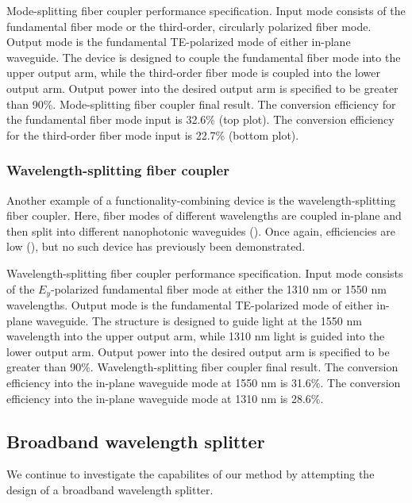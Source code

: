     {Mode-splitting fiber coupler performance specification.
    Input mode consists of the fundamental fiber mode or 
        the third-order, circularly polarized fiber mode.
    Output mode is the fundamental TE-polarized mode of either in-plane waveguide.
    The device is designed to couple the fundamental fiber mode into
        the upper output arm, 
        while the third-order fiber mode is coupled into the lower output arm.
    Output power into the desired output arm is specified to be greater than 90\%.}
    {Mode-splitting fiber coupler final result.
    The conversion efficiency for the fundamental fiber mode input is 32.6\% 
        (top plot).
    The conversion efficiency for the third-order fiber mode input is 22.7\% 
        (bottom plot).}

\subsubsection{Wavelength-splitting fiber coupler}
Another example of a functionality-combining device is the wavelength-splitting
    fiber coupler.
Here, fiber modes of different wavelengths are coupled in-plane
    and then split into different nanophotonic waveguides ().
Once again, efficiencies are low (),
    but no such device has previously been demonstrated.

    {Wavelength-splitting fiber coupler performance specification.
    Input mode consists of the $E_y$-polarized fundamental fiber mode at either
        the 1310 nm or 1550 nm wavelengths.
    Output mode is the fundamental TE-polarized mode of either in-plane waveguide.
    The structure is designed to guide light at the 1550 nm wavelength
        into the upper output arm,
        while 1310 nm light is guided into the lower output arm.
    Output power into the desired output arm is specified to be greater than 90\%.}
    {Wavelength-splitting fiber coupler final result.
    The conversion efficiency into the in-plane waveguide mode at 1550 nm is 31.6\%.
    The conversion efficiency into the in-plane waveguide mode at 1310 nm is 28.6\%.}

\subsection{Broadband wavelength splitter}
We continue to investigate the capabilites of our method
    by attempting the design of a broadband wavelength splitter.

